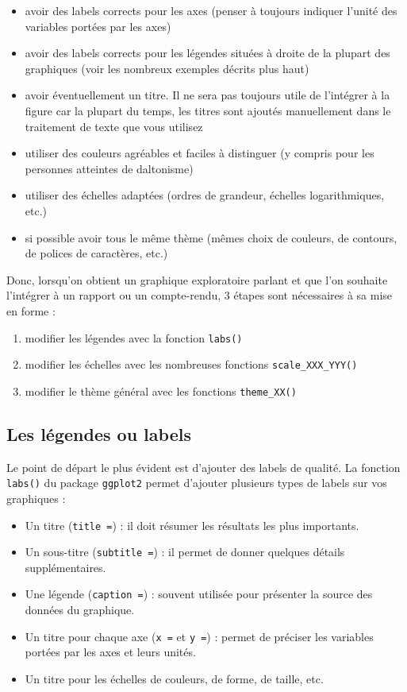 \documentclass[
  letterpaper,
  DIV=11,
  numbers=noendperiod]{scrreprt}
\providecommand{\tightlist}{%
  \setlength{\itemsep}{0pt}\setlength{\parskip}{0pt}}\usepackage{longtable,booktabs,array}
\begin{document}
\begin{itemize}
\tightlist
\item
  avoir des labels corrects pour les axes (penser à toujours indiquer
  l'unité des variables portées par les axes)
\item
  avoir des labels corrects pour les légendes situées à droite de la
  plupart des graphiques (voir les nombreux exemples décrits plus haut)
\item
  avoir éventuellement un titre. Il ne sera pas toujours utile de
  l'intégrer à la figure car la plupart du temps, les titres sont
  ajoutés manuellement dans le traitement de texte que vous utilisez
\item
  utiliser des couleurs agréables et faciles à distinguer (y compris
  pour les personnes atteintes de daltonisme)
\item
  utiliser des échelles adaptées (ordres de grandeur, échelles
  logarithmiques, etc.)
\item
  si possible avoir tous le même thème (mêmes choix de couleurs, de
  contours, de polices de caractères, etc.)
\end{itemize}

Donc, lorsqu'on obtient un graphique exploratoire parlant et que l'on
souhaite l'intégrer à un rapport ou un compte-rendu, 3 étapes sont
nécessaires à sa mise en forme :

\begin{enumerate}
\def\labelenumi{\arabic{enumi}.}
\tightlist
\item
  modifier les légendes avec la fonction \texttt{labs()}
\item
  modifier les échelles avec les nombreuses fonctions
  \texttt{scale\_XXX\_YYY()}
\item
  modifier le thème général avec les fonctions \texttt{theme\_XX()}
\end{enumerate}

\hypertarget{les-luxe9gendes-ou-labels}{%
\subsection{Les légendes ou labels}\label{les-luxe9gendes-ou-labels}}

Le point de départ le plus évident est d'ajouter des labels de qualité.
La fonction \texttt{labs()} du package \texttt{ggplot2} permet d'ajouter
plusieurs types de labels sur vos graphiques :

\begin{itemize}
\tightlist
\item
  Un titre (\texttt{title\ =}) : il doit résumer les résultats les plus
  importants.
\item
  Un sous-titre (\texttt{subtitle\ =}) : il permet de donner quelques
  détails supplémentaires.
\item
  Une légende (\texttt{caption\ =}) : souvent utilisée pour présenter la
  source des données du graphique.
\item
  Un titre pour chaque axe (\texttt{x\ =} et \texttt{y\ =}) : permet de
  préciser les variables portées par les axes et leurs unités.
\item
  Un titre pour les échelles de couleurs, de forme, de taille, etc.
\end{itemize}
\end{document}

